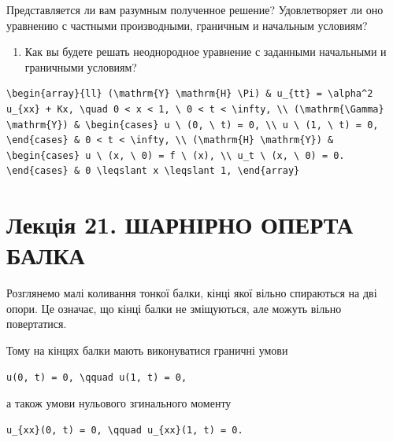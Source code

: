 \documentclass[
  ukrainian,
]{article}
\providecommand{\tightlist}{%
  \setlength{\itemsep}{0pt}\setlength{\parskip}{0pt}}
\begin{document}
Представляется ли вам разумным полученное решение? Удовлетворяет ли оно
уравнению с частными производными, граничным и начальным условиям?

\begin{enumerate}
\def\labelenumi{\arabic{enumi}.}
\setcounter{enumi}{6}
\tightlist
\item
  Как вы будете решать неоднородное уравнение с заданными начальными и
  граничными условиям?
\end{enumerate}

\begin{verbatim}
\begin{array}{ll} (\mathrm{Y} \mathrm{H} \Pi) & u_{tt} = \alpha^2 u_{xx} + Kx, \quad 0 < x < 1, \ 0 < t < \infty, \\ (\mathrm{\Gamma} \mathrm{Y}) & \begin{cases} u \ (0, \ t) = 0, \\ u \ (1, \ t) = 0, \end{cases} & 0 < t < \infty, \\ (\mathrm{H} \mathrm{Y}) & \begin{cases} u \ (x, \ 0) = f \ (x), \\ u_t \ (x, \ 0) = 0. \end{cases} & 0 \leqslant x \leqslant 1, \end{array}
\end{verbatim}

\section{Лекція 21. ШАРНІРНО ОПЕРТА
БАЛКА}\label{ux43bux435ux43aux446ux456ux44f-21.-ux448ux430ux440ux43dux456ux440ux43dux43e-ux43eux43fux435ux440ux442ux430-ux431ux430ux43bux43aux430}

Розглянемо малі коливання тонкої балки, кінці якої вільно спираються на
дві опори. Це означає, що кінці балки не зміщуються, але можуть вільно
повертатися.

Тому на кінцях балки мають виконуватися граничні умови

\begin{verbatim}
u(0, t) = 0, \qquad u(1, t) = 0,
\end{verbatim}

а також умови нульового згинального моменту

\begin{verbatim}
u_{xx}(0, t) = 0, \qquad u_{xx}(1, t) = 0.
\end{verbatim}
\end{document}

